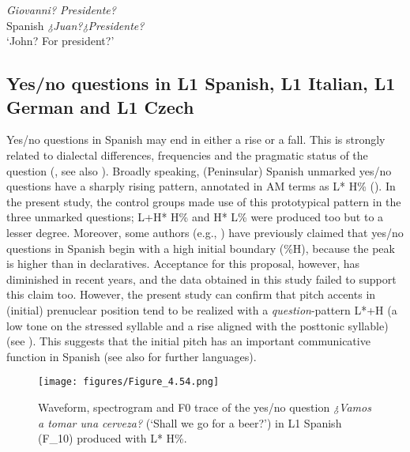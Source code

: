 \ex\label{ex:4:13}     \textit{Giovanni? Presidente?}\\
Spanish   \textit{¿Juan?¿Presidente?}\\
{}      {‘John? For president?’}\\
\z



\subsection{Yes/no questions in L1 Spanish, L1 Italian, L1 German and L1 Czech}\label{sec:4.3.1}

Yes/no questions in Spanish may end in either a rise or a fall. This is strongly related to dialectal differences, frequencies and the pragmatic status of the question (\citealt[371]{HualdePrieto2015}, see also  \citealt{NavarroTomás1948, Quilis1987, Sosa1999, Face2005,Face2008}). Broadly speaking, (Peninsular) Spanish unmarked yes/no questions have a sharply rising pattern, annotated in AM terms as L* H\% (\citealt{PrietoRoseano2010, HualdePrieto2015}). In the present study, the control groups made use of this prototypical pattern in the three unmarked questions; L+H* H\% and H* L\% were produced too but to a lesser degree. Moreover, some authors (e.g.,  \citealt{NavarroTomás1948, CanelladaKuhlmannMadsen1987, Sosa1999}) have previously claimed that yes/no questions in Spanish begin with a high initial boundary (\%H), because the peak is higher than in declaratives. Acceptance for this proposal, however, has diminished in recent years, and the data obtained in this study failed to support this claim too. However, the present study can confirm that pitch accents in (initial) prenuclear position tend to be realized with a \textit{question}{}-pattern L*+H (a low tone on the stressed syllable and a rise aligned with the posttonic syllable) (see ). This suggests that the initial pitch has an important communicative function in Spanish (see also \citealt{SicoliEtAl2015} for further languages).

\begin{figure}


\texttt{[image: figures/Figure\_4.54.png]}



\caption{Waveform, spectrogram and F0 trace of the yes/no question \textit{¿Vamos a tomar una cerveza?} (‘Shall we go for a beer?’) in L1 Spanish (F\_10) produced with L* H\%.}
\label{fig:4.54}
\end{figure}

